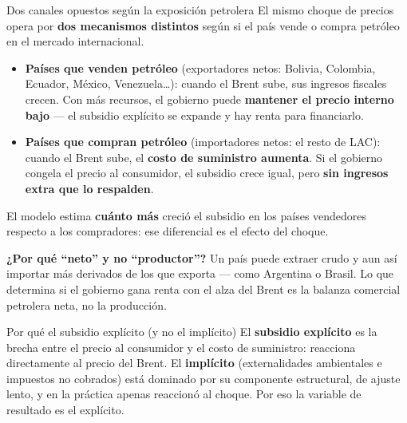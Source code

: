 \documentclass[aspectratio=169,10pt]{beamer}
\newcommand{\key}[1]{{\bfseries\color{AcentoRojo}#1}}
\begin{document}
\begin{frame}{Dos canales opuestos según la exposición petrolera}
  \footnotesize
  El mismo choque de precios opera por \textbf{dos mecanismos distintos} según si el país
  vende o compra petróleo en el mercado internacional.
  \begin{itemize}\setlength{\itemsep}{2pt}
    \item \textbf{Países que venden petróleo} (exportadores netos: Bolivia, Colombia, Ecuador,
          México, Venezuela\ldots): cuando el Brent sube, sus ingresos fiscales crecen.
          Con más recursos, el gobierno puede \textbf{mantener el precio interno bajo} —
          el subsidio explícito se expande y hay renta para financiarlo.
    \item \textbf{Países que compran petróleo} (importadores netos: el resto de LAC):
          cuando el Brent sube, el \textbf{costo de suministro aumenta}. Si el gobierno
          congela el precio al consumidor, el subsidio crece igual, pero \textbf{sin ingresos
          extra que lo respalden}.
  \end{itemize}
  El modelo estima \textbf{cuánto más} creció el subsidio en los países vendedores respecto
  a los compradores: ese diferencial es el efecto del choque.\vspace{0.3em}

  \textbf{¿Por qué ``neto'' y no ``productor''?} Un país puede extraer crudo y aun así importar
  más derivados de los que exporta — como Argentina o Brasil. Lo que determina si el gobierno
  gana renta con el alza del Brent es la \alert{balanza comercial petrolera neta}, no la
  producción.

  \begin{block}{Por qué el subsidio explícito (y no el implícito)}
    El \key{subsidio explícito} es la brecha entre el precio al consumidor y el costo de
    suministro: reacciona directamente al precio del Brent. El \textbf{implícito} (externalidades
    ambientales e impuestos no cobrados) está dominado por su componente estructural, de ajuste
    lento, y en la práctica apenas reaccionó al choque. Por eso la variable de resultado es el
    explícito.
  \end{block}

\end{frame}
\end{document}
